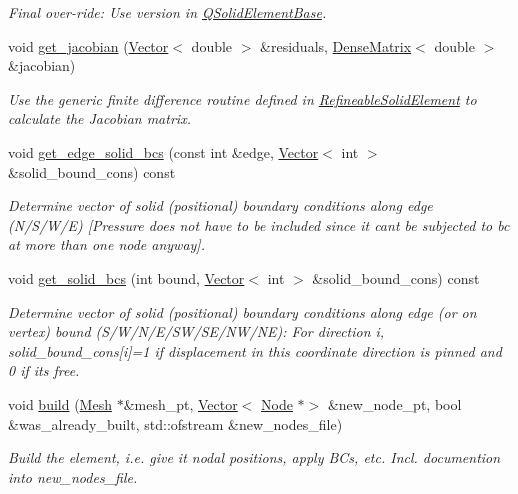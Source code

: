 \begin{DoxyCompactItemize}
\begin{DoxyCompactList}\small\item\em Final over-\/ride\+: Use version in \hyperlink{classoomph_1_1QSolidElementBase}{Q\+Solid\+Element\+Base}. \end{DoxyCompactList}\item 
void \hyperlink{classoomph_1_1RefineableSolidQElement_3_012_01_4_a9f9e21efe69a7bc8f47a227630ae94a9}{get\+\_\+jacobian} (\hyperlink{classoomph_1_1Vector}{Vector}$<$ double $>$ \&residuals, \hyperlink{classoomph_1_1DenseMatrix}{Dense\+Matrix}$<$ double $>$ \&jacobian)
\begin{DoxyCompactList}\small\item\em Use the generic finite difference routine defined in \hyperlink{classoomph_1_1RefineableSolidElement}{Refineable\+Solid\+Element} to calculate the Jacobian matrix. \end{DoxyCompactList}\item 
void \hyperlink{classoomph_1_1RefineableSolidQElement_3_012_01_4_af0166873124e0fd52d1a712c7b438891}{get\+\_\+edge\+\_\+solid\+\_\+bcs} (const int \&edge, \hyperlink{classoomph_1_1Vector}{Vector}$<$ int $>$ \&solid\+\_\+bound\+\_\+cons) const
\begin{DoxyCompactList}\small\item\em Determine vector of solid (positional) boundary conditions along edge (N/\+S/\+W/E) \mbox{[}Pressure does not have to be included since it can\textquotesingle{}t be subjected to bc at more than one node anyway\mbox{]}. \end{DoxyCompactList}\item 
void \hyperlink{classoomph_1_1RefineableSolidQElement_3_012_01_4_a5a06e687e147c9416ad56c166e55d27b}{get\+\_\+solid\+\_\+bcs} (int bound, \hyperlink{classoomph_1_1Vector}{Vector}$<$ int $>$ \&solid\+\_\+bound\+\_\+cons) const
\begin{DoxyCompactList}\small\item\em Determine vector of solid (positional) boundary conditions along edge (or on vertex) bound (S/\+W/\+N/\+E/\+S\+W/\+S\+E/\+N\+W/\+NE)\+: For direction i, solid\+\_\+bound\+\_\+cons\mbox{[}i\mbox{]}=1 if displacement in this coordinate direction is pinned and 0 if it\textquotesingle{}s free. \end{DoxyCompactList}\item 
void \hyperlink{classoomph_1_1RefineableSolidQElement_3_012_01_4_abebfabc831b862c49dc181ada6a7ca05}{build} (\hyperlink{classoomph_1_1Mesh}{Mesh} $\ast$\&mesh\+\_\+pt, \hyperlink{classoomph_1_1Vector}{Vector}$<$ \hyperlink{classoomph_1_1Node}{Node} $\ast$$>$ \&new\+\_\+node\+\_\+pt, bool \&was\+\_\+already\+\_\+built, std\+::ofstream \&new\+\_\+nodes\+\_\+file)
\begin{DoxyCompactList}\small\item\em Build the element, i.\+e. give it nodal positions, apply B\+Cs, etc. Incl. documention into new\+\_\+nodes\+\_\+file. \end{DoxyCompactList}\end{DoxyCompactItemize}
